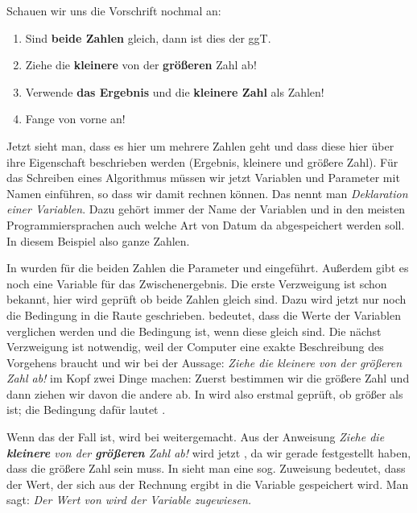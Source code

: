 Schauen wir uns die Vorschrift nochmal an:
\begin{enumerate}
\item Sind \textbf{beide Zahlen} gleich, dann ist dies der ggT.
\item Ziehe die \textbf{kleinere} von der \textbf{größeren} Zahl ab!
\item Verwende \textbf{das Ergebnis} und die \textbf{kleinere Zahl} als Zahlen!
\item Fange von vorne an!
\end{enumerate}

Jetzt sieht man, dass es hier um mehrere Zahlen geht und dass diese hier über ihre Eigenschaft beschrieben werden (Ergebnis, kleinere und größere Zahl). 
Für das Schreiben eines Algorithmus müssen wir jetzt Variablen und Parameter mit Namen einführen, so dass wir damit rechnen können. 
Das nennt man \textit{Deklaration einer Variablen}. 
Dazu gehört immer der Name der Variablen und in den meisten Programmiersprachen auch welche Art von Datum da abgespeichert werden soll. 
In diesem Beispiel also ganze Zahlen.

In  wurden für die beiden Zahlen die Parameter  und  eingeführt. Außerdem gibt es noch eine Variable  
für das Zwischenergebnis. 
Die erste Verzweigung  ist schon bekannt, hier wird geprüft ob beide Zahlen gleich sind. Dazu wird jetzt nur noch die Bedingung in die Raute geschrieben.  bedeutet, dass die Werte der Variablen verglichen werden und die Bedingung  ist, wenn diese gleich sind.
Die nächst Verzweigung  ist notwendig, weil der Computer eine exakte Beschreibung des Vorgehens braucht und wir bei der Aussage: 
\textit{Ziehe die kleinere von der größeren Zahl ab!}
im Kopf zwei Dinge machen: Zuerst bestimmen wir die größere Zahl und dann ziehen wir davon die andere ab. In  wird also erstmal geprüft, 
ob  größer als  ist; die Bedingung dafür lautet .

Wenn das der Fall ist, wird bei  weitergemacht. Aus der Anweisung \textit{Ziehe die \textbf{kleinere} von der \textbf{größeren} Zahl ab!} 
wird jetzt , da wir gerade festgestellt haben, dass  die größere Zahl sein muss. In  sieht man eine sog. Zuweisung 
 bedeutet, dass der Wert, der sich aus der Rechnung  ergibt in die Variable  gespeichert wird. 
Man sagt: \textit{Der Wert von  wird der Variable  zugewiesen. }

